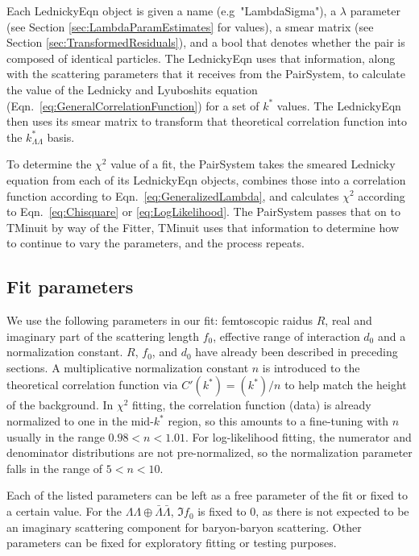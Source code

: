 Each LednickyEqn object is given a name (e.g\ "LambdaSigma"), a $\lambda$ parameter (see Section \ref{sec:LambdaParamEstimates} for values), a smear matrix (see Section \ref{sec:TransformedResiduals}), and a bool that denotes whether the pair is composed of identical particles.
The LednickyEqn uses that information, along with the scattering parameters that it receives from the PairSystem, to calculate the value of the Lednicky and Lyuboshits equation (Eqn.\ \ref{eq:GeneralCorrelationFunction}) for a set of $k^*$ values.
The LednickyEqn then uses its smear matrix to transform that theoretical correlation function into the $k^*_{\Lambda\Lambda}$ basis.

To determine the $\chi^2$ value of a fit, the PairSystem takes the smeared Lednicky equation from each of its LednickyEqn objects, combines those into a correlation function according to Eqn.\ \ref{eq:GeneralizedLambda}, and calculates $\chi^2$ according to Eqn.\ \ref{eq:Chisquare} or \ref{eq:LogLikelihood}.
The PairSystem passes that on to TMinuit by way of the Fitter, TMinuit uses that information to determine how to continue to vary the parameters, and the process repeats.

\subsection{Fit parameters}

We use the following parameters in our fit: femtoscopic raidus $R$, real and imaginary part of the scattering length $f_0$, effective range of interaction $d_0$ and a normalization constant.
$R$, $f_0$, and $d_0$ have already been described in preceding sections.
A multiplicative normalization constant $n$ is introduced to the theoretical correlation function via $C'(k^*) = (k^*)/n$ to help match the height of the background.
In $\chi^2$ fitting, the correlation function (data) is already normalized to one in the mid-$k^*$ region, so this amounts to a fine-tuning with $n$ usually in the range $0.98 < n < 1.01$.
For log-likelihood fitting, the numerator and denominator distributions are not pre-normalized, so the normalization parameter falls in the range of $5 < n < 10$.

Each of the listed parameters can be left as a free parameter of the fit or fixed to a certain value.
For the $\Lambda\Lambda \oplus \bar{\Lambda}\bar{\Lambda}$, $\Im f_0$ is fixed to 0, as there is not expected to be an imaginary scattering component for baryon-baryon scattering.
Other parameters can be fixed for exploratory fitting or testing purposes.

